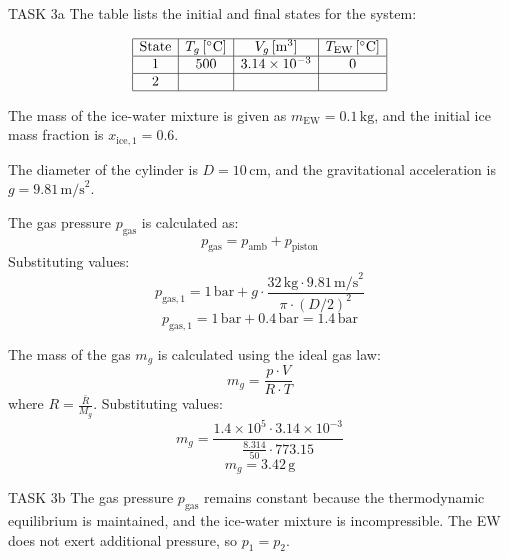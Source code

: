 TASK 3a  
The table lists the initial and final states for the system:  

\[
\begin{array}{|c|c|c|c|}
\hline
\text{State} & T_g \, [^\circ\text{C}] & V_g \, [\text{m}^3] & T_{\text{EW}} \, [^\circ\text{C}] \\
\hline
1 & 500 & 3.14 \times 10^{-3} & 0 \\
\hline
2 & & & \\
\hline
\end{array}
\]

The mass of the ice-water mixture is given as \( m_{\text{EW}} = 0.1 \, \text{kg} \), and the initial ice mass fraction is \( x_{\text{ice},1} = 0.6 \).  

The diameter of the cylinder is \( D = 10 \, \text{cm} \), and the gravitational acceleration is \( g = 9.81 \, \text{m/s}^2 \).  

The gas pressure \( p_{\text{gas}} \) is calculated as:  
\[
p_{\text{gas}} = p_{\text{amb}} + p_{\text{piston}}
\]
Substituting values:  
\[
p_{\text{gas},1} = 1 \, \text{bar} + g \cdot \frac{32 \, \text{kg} \cdot 9.81 \, \text{m/s}^2}{\pi \cdot (D/2)^2}
\]
\[
p_{\text{gas},1} = 1 \, \text{bar} + 0.4 \, \text{bar} = 1.4 \, \text{bar}
\]

The mass of the gas \( m_g \) is calculated using the ideal gas law:  
\[
m_g = \frac{p \cdot V}{R \cdot T}
\]
where \( R = \frac{\bar{R}}{M_g} \). Substituting values:  
\[
m_g = \frac{1.4 \times 10^5 \cdot 3.14 \times 10^{-3}}{\frac{8.314}{50} \cdot 773.15}
\]
\[
m_g = 3.42 \, \text{g}
\]

TASK 3b  
The gas pressure \( p_{\text{gas}} \) remains constant because the thermodynamic equilibrium is maintained, and the ice-water mixture is incompressible. The EW does not exert additional pressure, so \( p_1 = p_2 \).